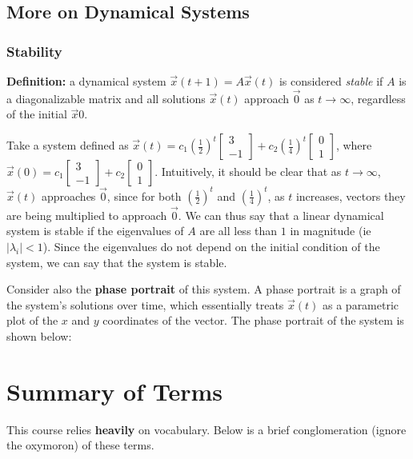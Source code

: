 \documentclass[12pt]{article}
\begin{document}
{{\subsection{More on Dynamical Systems}

\subsubsection{Stability}

\textbf{Definition: } a dynamical system $\vec{x}(t+1) = A\vec{x}(t)$ is considered \textit{stable} if $A$ is a diagonalizable matrix and all solutions $\vec{x}(t)$ approach $\vec{0}$ as $t \to \infty$, regardless of the initial $\vec{x}{0}$. 

Take a system defined as $\vec{x}(t) = c_1 (\frac{1}{2})^t \begin{bmatrix}
    3\\
    -1
\end{bmatrix} + c_2 (\frac{1}{4})^t \begin{bmatrix}
    0\\
    1
\end{bmatrix}$, where $\vec{x}(0) = c_1\begin{bmatrix}
    3\\
    -1
\end{bmatrix} + c_2\begin{bmatrix}
    0\\
    1
\end{bmatrix}$. Intuitively, it should be clear that as $t \to \infty$, $\vec{x}(t)$ approaches $\vec{0}$, since for both $(\frac{1}{2})^t$ and $(\frac{1}{4})^t$, as $t$ increases, vectors they are being multiplied to approach $\vec{0}$. We can thus say that a linear dynamical system is stable if the eigenvalues of $A$ are all less than $1$ in magnitude (ie $|\lambda_i| < 1$). Since the eigenvalues do not depend on the initial condition of the system, we can say that the system is stable.

Consider also the \textbf{phase portrait} of this system. A phase portrait is a graph of the system's solutions over time, which essentially treats $\vec{x}(t)$ as a parametric plot of the $x$ and $y$ coordinates of the vector. The phase portrait of the system is shown below:

\newpage
\section{Summary of Terms}

This course relies \textbf{heavily} on vocabulary. Below is a brief conglomeration (ignore the oxymoron) of these terms.

}}
\end{document}
